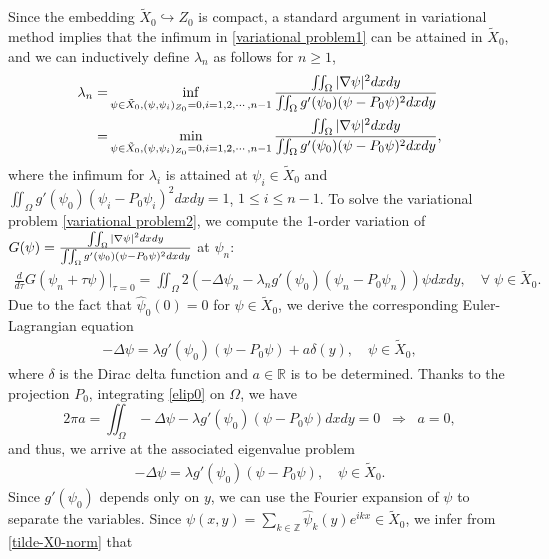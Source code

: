 \documentclass[1 [leqno, 11pt]{amsart}
\numberwithin{equation}{section}
\begin{document}
\begin{CJK*}{GBK}{song}
Since  the embedding  $\tilde X_0\hookrightarrow Z_{0}$ is  compact, a standard argument in variational method implies that
 the  infimum in  \eqref{variational problem1} can be attained in $\tilde X_0$, and we can
inductively define $\lambda_n$ as follows for $n\geq1$,
\begin{align}\nonumber
\lambda_n=& \inf_{\psi \in \tilde X_0, (\psi, \psi_{i})_{Z_0} = 0, i = 1, 2, \cdots, n-1}{\iint_\Omega|\nabla\psi|^2dxdy\over\iint_\Omega g'(\psi_0)(\psi - P_0\psi)^2dxdy}\\\label{variational problem2}
=&\min_{\psi \in \tilde X_0, (\psi, \psi_{i})_{Z_0} = 0, i = 1, 2, \cdots, n-1}{\iint_\Omega|\nabla\psi|^2dxdy\over\iint_\Omega g'(\psi_0)(\psi - P_0\psi)^2dxdy},
\end{align}
where the infimum for $\lambda_i$ is attained at $\psi_{i} \in \tilde X_0$ and $\iint_\Omega g'(\psi_0)(\psi_{i} - P_0\psi_{i})^2 dxdy = 1$, $1\leq i \leq n-1$.
To solve the variational problem \eqref{variational problem2}, we compute the 1-order variation of $G(\psi)={\iint_\Omega|\nabla\psi|^2dxdy\over\iint_\Omega g'(\psi_0)(\psi - P_0\psi)^2dxdy}$ at $\psi_{n}$:
\begin{align*}
\frac{d}{d \tau} G(\psi_{n} + \tau \psi)|_{\tau = 0} = \iint_{\Omega} 2\left(-\Delta\psi_n - \lambda_ng'(\psi_0)(\psi_n - P_0\psi_n)\right)\psi dxdy,\quad\forall\; \psi\in \tilde X_0.
\end{align*}
Due to the fact that  $\widehat{\psi}_0(0)=0$ for $\psi\in \tilde X_0$, we
derive the corresponding Euler-Lagrangian equation
\begin{align}\label{elip0}
-\Delta \psi = \lambda g'(\psi_0)(\psi - P_0\psi)+a\delta(y), \quad \psi \in \tilde{X}_0,
\end{align}
where $\delta$ is the Dirac delta function and $a\in\mathbb{R}$ is to be determined. Thanks to the projection $P_0$, integrating \eqref{elip0} on $\Omega$, we have
$$
2\pi a=\iint_\Omega-\Delta \psi -\lambda g'(\psi_0)(\psi - P_0\psi) dxdy=0\;\;\Longrightarrow \;\;a=0,
$$
and thus,  we arrive at the associated eigenvalue problem
\begin{align}\label{elip02}
-\Delta \psi = \lambda g'(\psi_0)(\psi - P_0\psi), \quad \psi \in \tilde{X}_0.
\end{align}
Since $g'(\psi_0)$ depends only on $y$, we can use the Fourier expansion of
$\psi$ to separate the variables.
Since $\psi(x,y)=\sum_{k\in\mathbb{Z}}\widehat{\psi}_{k}(y)e^{ik x} \in \tilde{X}_0$, we infer from \eqref{tilde-X0-norm} that
\begin{align}\label{def-space-Y0Yk}

\end{align}
\end{CJK*}
\end{document}
